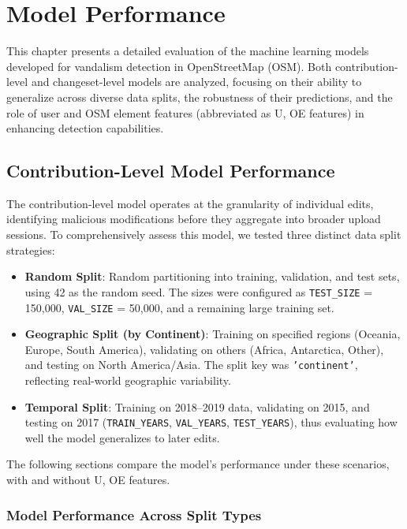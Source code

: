 \documentclass[
    13pt, %
    a4paper, %
    DIV14, %
    listof=totoc, %
    bibliography=totoc, %
    index=totoc, %
    headsepline
]{scrreprt}
\begin{document}
\chapter{Model Performance}
\label{chapter:model_performance}

This chapter presents a detailed evaluation of the machine learning models developed for vandalism detection in OpenStreetMap (OSM). Both contribution-level and changeset-level models are analyzed, focusing on their ability to generalize across diverse data splits, the robustness of their predictions, and the role of user and OSM element features (abbreviated as U, OE features) in enhancing detection capabilities.

\section{Contribution-Level Model Performance}
\label{sec:contribution_model_perf}

The contribution-level model operates at the granularity of individual edits, identifying malicious modifications before they aggregate into broader upload sessions. To comprehensively assess this model, we tested three distinct data split strategies:
\begin{itemize}
    \item \textbf{Random Split}: Random partitioning into training, validation, and test sets, using 42 as the random seed. The sizes were configured as \texttt{TEST\_SIZE} = 150,000, \texttt{VAL\_SIZE} = 50,000, and a remaining large training set.
    \item \textbf{Geographic Split (by Continent)}: Training on specified regions (Oceania, Europe, South America), validating on others (Africa, Antarctica, Other), and testing on North America/Asia. The split key was \texttt{'continent'}, reflecting real-world geographic variability.
    \item \textbf{Temporal Split}: Training on 2018--2019 data, validating on 2015, and testing on 2017 (\texttt{TRAIN\_YEARS}, \texttt{VAL\_YEARS}, \texttt{TEST\_YEARS}), thus evaluating how well the model generalizes to later edits.
\end{itemize}

The following sections compare the model’s performance under these scenarios, with and without U, OE features.

\subsection{Model Performance Across Split Types}
\label{sec:split_performance}
\end{document}
